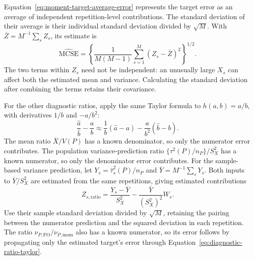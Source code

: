 Equation~\eqref{eq:moment-target-average-error} represents the target error
as an average of independent repetition-level contributions. The standard
deviation of their average is their individual standard deviation divided
by \(\sqrt M\). With \(\bar Z=M^{-1}\sum_s Z_s\), its estimate is
\begin{equation}
 \widehat{\mathrm{MCSE}}
 =\left\{\frac{1}{M(M-1)}\sum_{s=1}^M(Z_s-\bar Z)^2\right\}^{1/2}.
 \label{eq:moment-df-mcse}
\end{equation}
The two terms within \(Z_s\) need not be independent: an unusually
large \(X_s\) can affect both the estimated mean and variance.
Calculating the standard deviation after combining the terms retains
their covariance.

For the other diagnostic ratios, apply the same Taylor formula to
\(h(a,b)=a/b\), with derivatives \(1/b\) and \(-a/b^2\):
\begin{equation}
 \frac{\widehat a}{\widehat b}-\frac{a}{b}
 \approx\frac{1}{b}(\widehat a-a)
       -\frac{a}{b^2}(\widehat b-b).
 \label{eq:diagnostic-ratio-taylor}
\end{equation}
The mean ratio \(\bar X/V(P)\) has a known denominator, so only the
numerator error contributes. The population variance-prediction ratio
\(\{\tau^2(P)/n_P\}/S_X^2\) has a known numerator, so only the
denominator error contributes. For the sample-based variance prediction,
let \(Y_s=\widehat\tau_s^2(P)/n_P\) and
\(\bar Y=M^{-1}\sum_sY_s\). Both inputs to \(\bar Y/S_X^2\) are
estimated from the same repetitions, giving estimated contributions
\begin{equation}
 Z_{s,\mathrm{ratio}}
 =\frac{Y_s-\bar Y}{S_X^2}
  -\frac{\bar Y}{(S_X^2)^2}W_s.
 \label{eq:plugin-variance-ratio-mc-contribution}
\end{equation}
Use their sample standard deviation divided by \(\sqrt M\), retaining
the pairing between the numerator prediction and the squared deviation
in each repetition. The ratio \(\nu_{P,\mathrm{FO}}/\nu_{P,\mathrm{mom}}\)
also has a known numerator, so its error follows by propagating only
the estimated target's error through Equation~\eqref{eq:diagnostic-ratio-taylor}.
